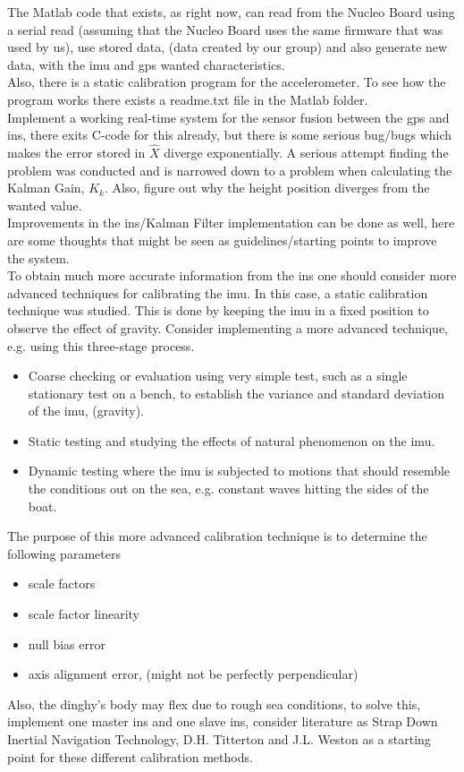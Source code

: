 The Matlab code that exists, as right now, can read from the Nucleo Board using a serial read (assuming that the Nucleo Board uses the same firmware that was used by us), use stored data, (data created by our group) and also generate new data, with the \gls{imu} and \gls{gps} wanted characteristics. \\
Also, there is a static calibration program for the accelerometer. To see how the program works there exists a readme.txt file in the Matlab folder.\\

Implement a working real-time system for the sensor fusion between the \gls{gps} and \gls{ins}, there exits C-code for this already, but there is some serious bug/bugs which makes the error stored in $\hat{X}$ diverge exponentially. A serious attempt finding the problem was conducted and is narrowed down to a problem when calculating the Kalman Gain, $K_k$. Also, figure out why the height position diverges from the wanted value.\\

Improvements in the \gls{ins}/Kalman Filter implementation can be done as well, here are some thoughts that might be seen as guidelines/starting points to improve the system. \\
To obtain much more accurate information from the \gls{ins} one should consider more advanced techniques for calibrating the \gls{imu}. In this case, a static calibration technique was studied. This is done by keeping the \gls{imu} in a fixed position to observe the effect of gravity.
Consider implementing a more advanced technique, e.g. using this three-stage process.
\begin{itemize}
\item Coarse checking or evaluation using very simple test, such as a single stationary test on a bench, to establish the variance and standard deviation of the \gls{imu}, (gravity).
\item Static testing and studying the effects of natural phenomenon on the \gls{imu}.
\item Dynamic testing where the \gls{imu} is subjected to motions that should resemble the conditions out on the sea, e.g. constant waves hitting the sides of the boat. 
\end{itemize}
The purpose of this more advanced calibration technique is to determine the following parameters \cite{non-linear}
\begin{itemize}
\item scale factors
\item scale factor linearity
\item null bias error
\item axis alignment error, (might not be perfectly perpendicular)
\end{itemize}
Also, the dinghy's body may flex due to rough sea conditions, to solve this, implement one master \gls{ins} and one slave \gls{ins}, consider literature as Strap Down Inertial Navigation Technology, D.H. Titterton and J.L. Weston as a starting point for these different calibration methods. \newline 

